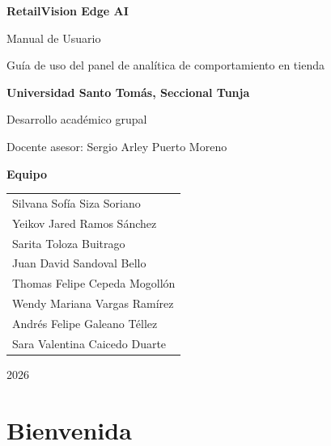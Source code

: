 \documentclass[11pt,a4paper]{report}
\begin{document}
\begin{titlepage}
\centering
\vspace*{1.5cm}
{\Huge\bfseries\color{rvAccent} RetailVision Edge AI\par}
\vspace{0.4cm}
{\Large\color{rvInk} Manual de Usuario\par}
\vspace{0.3cm}
{\large\color{rvMuted} Guía de uso del panel de analítica de comportamiento en tienda\par}
\vspace{2.2cm}

{\large\color{rvInk}\textbf{Universidad Santo Tomás, Seccional Tunja}\par}
\vspace{0.2cm}
{\normalsize\color{rvMuted} Desarrollo académico grupal\par}
\vspace{0.15cm}
{\normalsize\color{rvMuted} Docente asesor: Sergio Arley Puerto Moreno\par}

\vspace{2.2cm}
{\normalsize\color{rvInk}\textbf{Equipo}\par}
\vspace{0.3cm}
\begin{tabular}{l}
Silvana Sofía Siza Soriano \\
Yeikov Jared Ramos Sánchez \\
Sarita Toloza Buitrago \\
Juan David Sandoval Bello \\
Thomas Felipe Cepeda Mogollón \\
Wendy Mariana Vargas Ramírez \\
Andrés Felipe Galeano Téllez \\
Sara Valentina Caicedo Duarte \\
\end{tabular}

\vfill
{\large\color{rvMuted} 2026\par}
\end{titlepage}

\tableofcontents
\clearpage

\chapter{Bienvenida}
\end{document}
